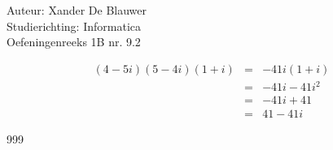 \documentclass[a4paper]{article}
\begin{document}
\noindent \large Auteur: Xander De Blauwer \\
\noindent \large Studierichting: Informatica\\
\noindent \large Oefeningenreeks 1B nr. 9.2\\

\medskip

\normalsize

\begin{eqnarray*}
  (4 - 5i)(5 - 4i)(1 + i)
  &=& -41i(1+i) \\
  &=& -41i - 41i^2 \\
  &=& -41i + 41 \\
  &=& 41 - 41i
\end{eqnarray*}



\begin{thebibliography}{999}
\end{thebibliography}
\end{document}
